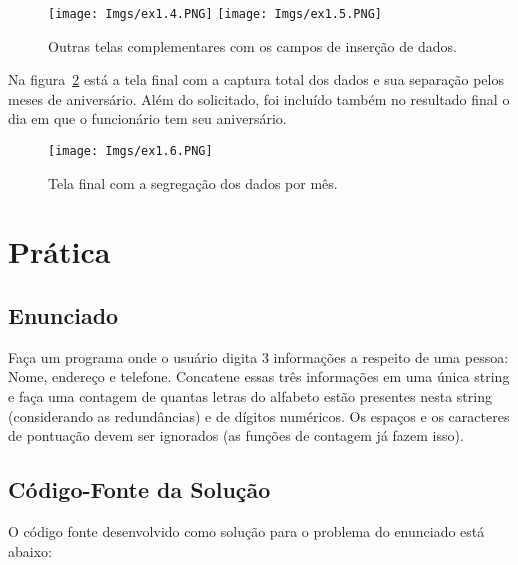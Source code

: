 \documentclass[
	12pt,				%
	openright,			%
	oneside,			%
	a4paper,			%
	chapter=TITLE,		%
	section=TITLE,		%
	english,			%
	french,				%
	spanish,			%
	brazil				%
	]{abntex2}
\begin{document}
	\vspace*{-8mm}

	\begin{figure}[htb]
		\begin{center}
			\caption{Outras telas complementares com os campos de inserção de dados.}
			\label{fig:ex1.45}
			\texttt{[image: Imgs/ex1.4.PNG]} \quad
			\texttt{[image: Imgs/ex1.5.PNG]} \quad
		\end{center}
	\end{figure}


	Na figura~\ref{fig:ex1.6} está a tela final com a captura total dos dados e sua separação pelos meses de aniversário. Além do solicitado, foi incluído também no resultado final o dia em que o funcionário tem seu aniversário.

	\begin{figure}[ht]
		\begin{center}
			\caption{Tela final com a segregação dos dados por mês.} 
			\texttt{[image: Imgs/ex1.6.PNG]}
			\label{fig:ex1.6}
		\end{center}
	\end{figure}


\chapter[\bfseries{PRÁTICA 2}]{\bfseries{Prática}}

\section[ENUNCIADO]{Enunciado}
	
	Faça um programa onde o usuário digita 3 informações a respeito de uma pessoa: Nome, endereço e telefone. Concatene essas três informações em uma única string e faça uma contagem de quantas letras do alfabeto estão presentes nesta string (considerando as redundâncias) e de dígitos numéricos. Os espaços e os caracteres de pontuação devem ser ignorados (as funções de contagem já fazem isso).

\section[CÓDIGO-FONTE DA SOLUÇÃO]{Código-Fonte da Solução}

	O código fonte desenvolvido como solução para o problema do enunciado está abaixo:
\end{document}
